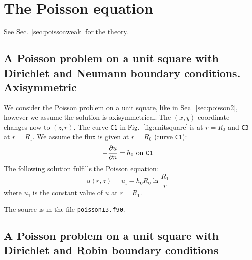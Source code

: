 
\def\headdate{17th November 2022}

\section{The Poisson equation}

See Sec.~\ref{sec:poissonweak} for the theory.

\subsection{A Poisson problem on a unit square with Dirichlet
            and Neumann boundary conditions. Axisymmetric}

\label{sec:poisson13}
We consider the Poisson problem on a unit square, like in
Sec.~\ref{sec:poisson2}, however we assume the solution is axisymmetrical.
The $(x,y)$ coordinate changes now to $(z,r)$. The curve \texttt{C1} in
Fig.~\ref{fig:unitsquare} is at $r=R_0$ and \texttt{C3} at $r=R_1$. We assume
the flux is given at $r=R_0$ (curve \texttt{C1}):
\begin{equation}
   -\dfrac{\partial u}{\partial n} = h_\text{0}\text{ on \texttt{C1}}
\end{equation}
The following solution fulfills the Poisson equation:
\begin{equation}
   u(r,z) = u_1 - h_0R_0\ln\frac{R_1}r
\end{equation}
where $u_1$ is the constant value of $u$ at $r=R_1$.

The source is in the file \texttt{poisson13.f90}.

\subsection{A Poisson problem on a unit square with Dirichlet
            and Robin boundary conditions}

